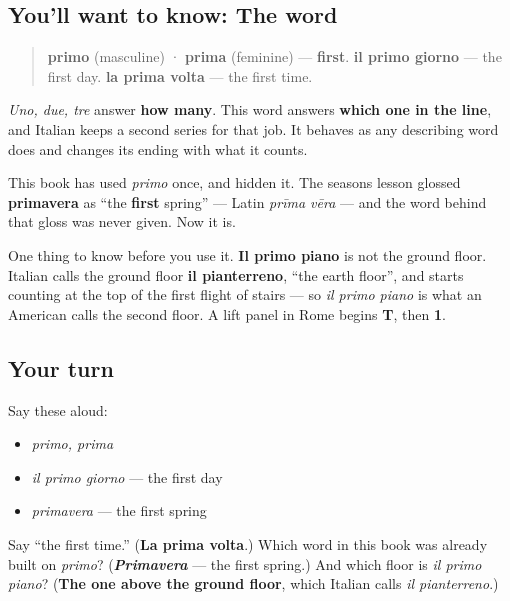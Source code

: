 \subsection*{You'll want to know: The word}
\begin{quote}
\textbf{primo} (masculine) · \textbf{prima} (feminine) — \textbf{first}. \textbf{il primo giorno} — the first day. \textbf{la prima volta} — the first time.
\end{quote}

\emph{Uno, due, tre} answer \textbf{how many}. This word answers \textbf{which one in the line}, and Italian keeps a second series for that job. It behaves as any describing word does and changes its ending with what it counts.

\begin{cousinweb}
This book has used \emph{primo} once, and hidden it. The seasons lesson glossed \textbf{primavera} as \textquotedblleft{}the \textbf{first} spring\textquotedblright{} — Latin \emph{prīma vēra} — and the word behind that gloss was never given. Now it is.

One thing to know before you use it. \textbf{Il primo piano} is not the ground floor. Italian calls the ground floor \textbf{il pianterreno}, \textquotedblleft{}the earth floor\textquotedblright{}, and starts counting at the top of the first flight of stairs — so \emph{il primo piano} is what an American calls the second floor. A lift panel in Rome begins \textbf{T}, then \textbf{1}.
\end{cousinweb}

\subsection*{Your turn}
Say these aloud:

\begin{itemize}
\raggedright
  \item \emph{primo, prima}
  \item \emph{il primo giorno} — the first day
  \item \emph{primavera} — the first spring
\end{itemize}

\begin{tcolorbox}[breakable,colback=teal!4,colframe=teal!35!black,title={Before you move on}]
Say \textquotedblleft{}the first time.\textquotedblright{} (\textbf{La prima volta}.) Which word in this book was already built on \emph{primo}? (\emph{\textbf{Primavera}} — the first spring.) And which floor is \emph{il primo piano}? (\textbf{The one above the ground floor}, which Italian calls \emph{il pianterreno}.)
\end{tcolorbox}
